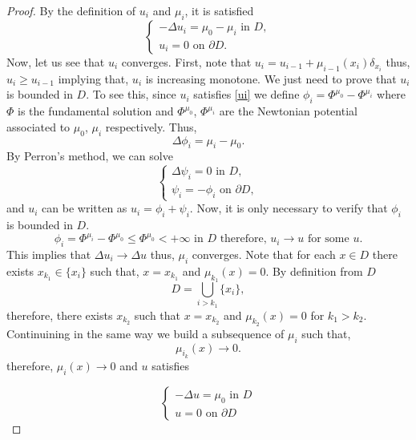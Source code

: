 \documentclass{article}
\begin{document}
\begin{proof}
    By the definition of $u_i$ and $\mu_i$, it is satisfied
	\begin{equation}
	\begin{cases}
	 -\Delta u_i=\mu_0-\mu_i \text{ in } D,\\
	u_i=0 \text{ on } \partial D.
	\end{cases}\label{ui}
	\end{equation}
	Now, let us see that $u_i$ converges. First, note that $u_i=u_{i-1}+\mu_{i-1}(x_i)\delta_{x_i}$ thus, $u_i\geq u_{i-1}$ implying that, $u_i$ is increasing monotone. We just need to prove that $u_i$ is bounded in $D$. To see this, since $u_i$ satisfies \eqref{ui} we define $\phi_i=\Phi^{\mu_0}-\Phi^{\mu_i}$ where $\Phi$ is the fundamental solution and $\Phi^{\mu_0}$, $\Phi^{\mu_i}$ are the Newtonian potential associated to $\mu_0$, $\mu_i$ respectively. Thus,
	\[
	  \Delta \phi_i=\mu_i-\mu_0.
	\]
	By Perron's method, we can solve
	\begin{equation*}
	\begin{cases}
	\Delta \psi_i=0 \text{ in } D,\\
	\psi_i=-\phi_i \text{ on } \partial D,
	\end{cases}
	\end{equation*}
	and $u_i$ can be written as $u_i=\phi_i+\psi_i$. Now, it is only necessary to verify that $\phi_i$ is bounded in $D$. 
	\[ 
	 \phi_i=\Phi^{\mu_i}-\Phi^{\mu_0}\leq \Phi^{\mu_0}<+\infty \text{ in } D \text{ therefore, } u_i\rightarrow u \text{ for some } u.
	\]
     This implies that $\Delta u_i\rightarrow \Delta u$ thus, $\mu_i$ converges. Note that for each $x\in D$ there exists $x_{k_1}\in \{x_i\}$ such that, $x=x_{k_1}$ and $\mu_{k_1}(x)=0$. By definition from $D$
	\[
	 D=\bigcup \limits_{i> k_1}\{x_i\},
	\] 
	therefore, there exists $x_{k_2}$ such that $x=x_{k_2}$ and $\mu_{k_2}(x)=0$ for $k_1>k_2$. Continuining in the same way we build a subsequence of $\mu_i$ such that,
	\[
	  \mu_{i_k}(x)\rightarrow 0.
	\]
	therefore, $\mu_i(x)\rightarrow 0$ and $u$ satisfies 
    
	\begin{equation*}
	\begin{cases}
	-\Delta u=\mu_0 \text{ in } D\\
	u=0 \text{ on } \partial D
	\end{cases}
	\end{equation*}
\end{proof}
\end{document}
